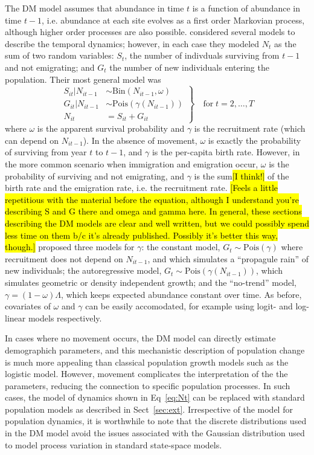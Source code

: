 \documentclass[12pt]{article}
\begin{document}
The DM model assumes that abundance in time $t$ is a function of
abundance in time $t-1$, i.e. abundance at each site evolves as a
first order Markovian process, although
higher order processes are also possible.  \citet{dail_madsen:2011}
considered several models to describe the temporal dynamics; however,
in each case they modeled $N_t$ as the sum of two random variables:
$S_t$, the number of indivduals surviving from $t-1$ and not
emigrating; and $G_t$ the number of new individuals entering the
population. Their most general model was
\begin{equation}
\left.\begin{aligned}
S_{it}|N_{it-1} &\sim \mathrm{Bin}(N_{it-1}, \omega) \\
G_{it}|N_{it-1} &\sim \mathrm{Pois}(\gamma(N_{it-1})) \\
N_{it} &= S_{it}+G_{it}
\end{aligned}\right\} \quad \text{for} \; t=2,\hdots,T
\label{eq:Nt}
\end{equation}
where $\omega$ is the apparent survival probability and $\gamma$ is
the recruitment rate (which can depend on $N_{it-1}$). In the absence
of movement, $\omega$ is exactly the probability of surviving from
year $t$ to $t-1$, and $\gamma$ is the per-capita birth rate. However,
in the more common scenario when immigration and emigration occur,
$\omega$ is the probability of surviving and not emigrating, and
$\gamma$ is the sum\hl{[I think!]} of the birth rate and the emigration rate,
i.e. the recruitment rate. \hl{[Feels a little repetitious with the material
before the equation, although I understand you're describing S and G
there and omega and gamma here.  In general, these sections
describing the DM models are clear and well written, but we could
possibly spend less time on them b/c it's already published.
Possibly it's better this way, though.]} \citet{dail_madsen:2011} proposed three
models for $\gamma$: the constant model,
$G_t \sim \mathrm{Pois}(\gamma)$ where recruitment does not depend on
$N_{it-1}$, and which simulates a ``propagule rain'' of new individuals; the
autoregressive model, $G_t \sim \mathrm{Pois}(\gamma(N_{it-1}))$, which
simulates geometric or density independent growth; and the
``no-trend'' model, $\gamma = (1-\omega)\Lambda$, which keeps
expected abundance constant over time. As before, covariates of
$\omega$ and $\gamma$ can be easily accomodated, for example using
logit- and log-linear models respectively.

In cases where no movement occurs, the DM model can directly estimate
demographich parameters, and this mechanistic description of
population change is much more appealing than classical
population growth models such as the logistic model. However, movement
complicates the interpretation of the the parameters, reducing the
connection to specific population processes. In such cases, the model
of dynamics shown in Eq~\ref{eq:Nt} can be replaced with standard
population models as described in Sect~\ref{sec:ext}. Irrespective of
the model for population dynamics, it is worthwhile to note that the
discrete distributions used in the DM model avoid the issues
associated with the Gaussian distribution used to model process
variation in standard state-space models.
\end{document}
